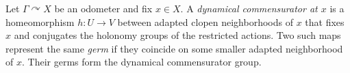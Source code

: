 
Let $\Gamma\curvearrowright X$ be an odometer and fix $x\in X$. A \emph{dynamical commensurator at $x$} is a homeomorphism $h:U\to V$ between adapted clopen neighborhoods of $x$ that fixes $x$ and conjugates the holonomy groups of the restricted actions. Two such maps represent the same \emph{germ} if they coincide on some smaller adapted neighborhood of $x$. Their germs form the dynamical commensurator group.
